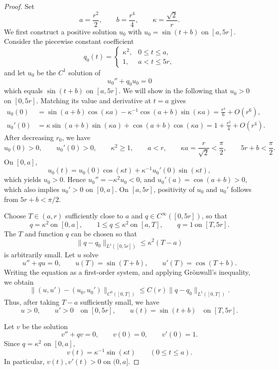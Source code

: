 \documentclass[11pt,reqno]{amsart}
\theoremstyle{definition}
\numberwithin{equation}{section}
\begin{document}
\begin{proof}
Set
\[
 a=\frac{r^2}{2},\qquad
 b=\frac{r^4}{4},\qquad
 \kappa=\frac{\sqrt2}{r}.
\]
We first construct a positive solution $u_0$ with $u_0=\sin(t+b)$ on $[a,5r]$. Consider the piecewise constant coefficient
\[
 q_0(t)=
 \begin{cases}
  \kappa^2,&0\le t\le a,\\
  1,&a<t\le5r,
 \end{cases}
\]
and let \(u_0\) be the \(C^1\) solution of
\[
 u_0''+q_0u_0=0
\]
which equals \(\sin(t+b)\) on \([a,5r]\).  We will show in the following that $u_0>0$ on $[0,5r]$. Matching its value and
derivative at \(t=a\) gives
\begin{align*}
 u_0(0)
 &=\sin(a+b)\cos(\kappa a)
   -\kappa^{-1}\cos(a+b)\sin(\kappa a)
   =\frac{r^4}{6}+O(r^6),\\
 u_0'(0)
 &=\kappa\sin(a+b)\sin(\kappa a)
   +\cos(a+b)\cos(\kappa a)
   =1+\frac{r^2}{4}+O(r^4).
\end{align*}
After decreasing \(r_0\), we have
\[
 u_0(0)>0,\qquad u_0'(0)>0,\qquad
 \kappa^2\ge1,\qquad a<r,\qquad
 \kappa a=\frac r{\sqrt2}<\frac{\pi}{2},
 \qquad 5r+b<\frac{\pi}{2}.
\]
On \([0,a]\),
\[
 u_0(t)=u_0(0)\cos(\kappa t)
        +\kappa^{-1}u_0'(0)\sin(\kappa t),
\]
which yields \(u_0>0\).  Hence \(u_0''=-\kappa^2u_0<0\), and
\(u_0'(a)=\cos(a+b)>0\), which also implies \(u_0'>0\) on \([0,a]\).
On \([a,5r]\), positivity of \(u_0\) and \(u_0'\) follows from
\(5r+b<\pi/2\).

Choose \(T\in(a,r)\) sufficiently close to \(a\) and 
\(q\in C^\infty([0,5r])\), so that
\[
 q=\kappa^2\ \text{on }[0,a],\qquad
 1\le q\le\kappa^2\ \text{on }[a,T],\qquad
 q=1\ \text{on }[T,5r].
\]
The $T$ and function $q$ can be chosen so that
\[
 \|q-q_0\|_{L^1([0,5r])}
 \le \kappa^2(T-a)
\]
is arbitrarily small.  Let \(u\) solve
\[
 u''+qu=0,\qquad
 u(T)=\sin(T+b),\qquad u'(T)=\cos(T+b).
\]
Writing the equation as a first-order system, and applying Grönwall's
inequality, we obtain
\[
 \|(u,u')-(u_0,u_0')\|_{C^0([0,T])}
 \le C(r)\|q-q_0\|_{L^1([0,T])}.
\]
Thus, after taking \(T-a\) sufficiently small, we have
\begin{equation}
 u>0,\qquad u'>0\quad\text{on }[0,5r],
 \qquad
 u(t)=\sin(t+b)\quad\text{on }[T,5r].
 \label{eq:warping-background-solution}
\end{equation}

Let \(v\) be the solution
\[
 v''+qv=0,\qquad v(0)=0,\qquad v'(0)=1.
\]
Since \(q=\kappa^2\) on \([0,a]\),
\begin{equation}
 v(t)=\kappa^{-1}\sin(\kappa t)
 \qquad(0\le t\le a).
 \label{eq:warping-pole-solution}
\end{equation}
In particular, \(v(t),v'(t)>0\) on \((0,a]\).


\end{proof}
\end{document}

